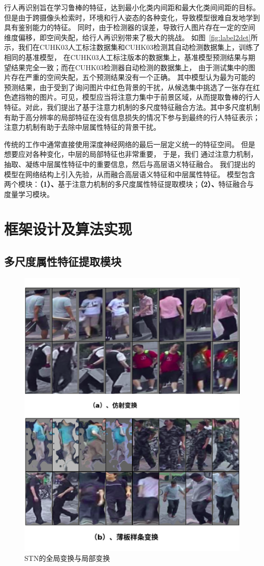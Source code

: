 行人再识别旨在学习鲁棒的特征，达到最小化类内间距和最大化类间间距的目标。
但是由于跨摄像头检索时，环境和行人姿态的各种变化，导致模型很难自发地学到具有鉴别能力的特征。
同时，由于检测器的误差，导致行人图片存在一定的空间维度偏移，即空间失配，给行人再识别带来了极大的挑战。
如图~\ref{fig:label2det}所示，我们在CUHK03人工标注数据集和CUHK03检测其自动检测数据集上，训练了相同的基准模型，
在CUHK03人工标注版本的数据集上，基准模型预测结果与期望结果完全一致；而在CUHK03检测器自动检测的数据集上，
由于测试集中的图片存在严重的空间失配，五个预测结果没有一个正确。
其中模型认为最为可能的预测结果，由于受到了询问图片中红色背景的干扰，从候选集中挑选了一张存在红色遮挡物的图片。可见，模型应当将注意力集中于前景区域，从而提取鲁棒的行人特征。对此，我们提出了基于注意力机制的多尺度特征融合方法。其中多尺度机制有助于高分辨率的局部特征在没有信息损失的情况下参与到最终的行人特征表示；注意力机制有助于去除中层属性特征的背景干扰。

传统的工作中通常直接使用深度神经网络的最后一层定义统一的特征空间。
但是想要应对各种变化，中层的局部特征也非常重要\cite{yu2017devil}，
于是，我们 
通过注意力机制，抽取、凝练中层属性特征中的重要信息，然后与高层语义特征融合。
我们提出的模型在网络结构上引入先验，从而融合高层语义特征和中层属性特征。
模型包含两个模块：\textbf{（1）、}基于注意力机制的多尺度属性特征提取模块；\textbf{（2）、}特征融合与度量学习模块。

\section{框架设计及算法实现}

\subsection{多尺度属性特征提取模块}

\begin{figure}
	\centering 
	\includegraphics[width=.75\textwidth]{fig/stn1.png}
	\caption{STN的全局变换与局部变换} \label{fig:stn-lc-gl}
\end{figure}


